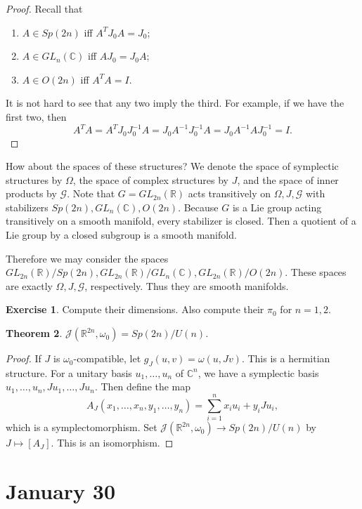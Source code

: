 \documentclass[leqno, openany]{memoir}
\newtheorem{thm}{Theorem}[chapter]
\theoremstyle{definition}
\newtheorem{exer}[thm]{Exercise}
\theoremstyle{remark}
\theoremstyle{plain}
\theoremstyle{definition}
\theoremstyle{remark}
\newcommand{\R}{\mathbb{R}}
\newcommand{\C}{\mathbb{C}}
\newcommand{\mc}[1]{\mathcal{#1}}
\begin{document}
\begin{proof}
    Recall that
    \begin{enumerate}
        \item $A \in Sp(2n)$ iff $A^TJ_0A = J_0$;
        \item $A \in GL_n(\C)$ iff $AJ_0 = J_0A$;
        \item $A \in O(2n)$ iff $A^TA = I$.
    \end{enumerate}
    It is not hard to see that any two imply the third.
    For example, if we have the first two, then 
    \[A^TA = A^TJ_0J_0^{-1}A = J_0A^{-1}J_0^{-1}A = J_0A^{-1}AJ_0^{-1} = I.\]
\end{proof}

How about the spaces of these structures? We denote the space of symplectic structures by $\Omega$, the space of complex structures by $J$, and the space of inner products by $\mc{G}$. Note that $G = GL_{2n}(\R)$ acts transitively on $\Omega, J, \mc{G}$ with stabilizers $Sp(2n), GL_{n}(\C), O(2n)$. Because $G$ is a Lie group acting transitively on a smooth manifold, every stabilizer is closed. Then a quotient of a Lie group by a closed subgroup is a smooth manifold.

Therefore we may consider the spaces $GL_{2n}(\R)/Sp(2n), GL_{2n}(\R)/GL_n(\C), GL_{2n}(\R)/O(2n)$. These spaces are exactly $\Omega, J, \mc{G}$, respectively. Thus they are smooth manifolds.

\begin{exer}
    Compute their dimensions. Also compute their $\pi_0$ for $n = 1,2$.
\end{exer}

\begin{thm}
    $\mc{J}(\R^{2n}, \omega_0) = Sp(2n)/U(n)$.
\end{thm}

\begin{proof}
    If $J$ is $\omega_0$-compatible, let $g_J(u,v) = \omega(u, Jv)$. This is a hermitian structure. For a unitary basis $u_1, \ldots, u_n$ of $\C^n$, we have a symplectic basis $u_1, \ldots, u_n, Ju_1, \ldots, Ju_n$. Then define the map
    \[A_J(x_1, \ldots, x_n, y_1, \ldots, y_n) = \sum_{i=1}^n x_iu_i + y_iJu_i, \]
    which is a symplectomorphism. Set $\mc{J}(\R^{2n}, \omega_0) \to Sp(2n)/U(n)$ by $J \mapsto [A_J]$. This is an isomorphism.
\end{proof}

\chapter{January 30}%
\label{cha:january_30}
\end{document}
